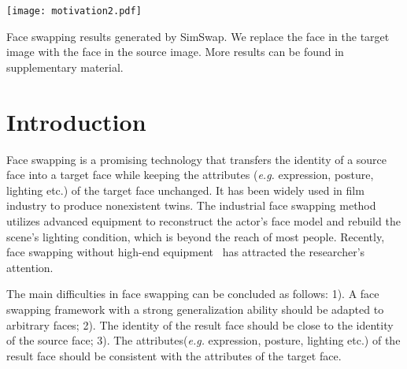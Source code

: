 \documentclass[sigconf]{acmart}
\begin{document}

\begin{teaserfigure}
  \texttt{[image: motivation2.pdf]}
  \caption{Face swapping results generated by SimSwap. We replace the face in the target image with the face in the source image. More results can be found in supplementary material.}
  \label{fig:teaser}
\end{teaserfigure}

\maketitle

\section{Introduction}
Face swapping is a promising technology that transfers the identity of a source face into a target face while keeping the attributes (\emph{e.g.} expression, posture, lighting etc.) of the target face unchanged. It has been widely used in film industry to produce nonexistent twins. The industrial face swapping method utilizes advanced equipment to reconstruct the actor's face model and rebuild the scene's lighting condition, which is beyond the reach of most people. Recently, face swapping without high-end equipment~\cite{DBLP:Identity,DBLP:FaceShifter,DBLP:FSGAN,DeepFakes} has attracted the researcher's attention.

The main difficulties in face swapping can be concluded as follows:
1). A face swapping framework with a strong generalization ability should be adapted to arbitrary faces;
2). The identity of the result face should be close to the identity of the source face;
3). The attributes(\emph{e.g.} expression, posture, lighting etc.) of the result face should be consistent with the attributes of the target face.
\end{document}
